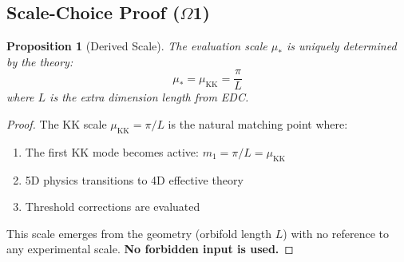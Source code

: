 \documentclass[11pt,a4paper]{article}
\newtheorem{proposition}{Proposition}[section]
\begin{document}
\begin{center}
\end{center}

\subsection{Scale-Choice Proof ($\Omega$1)}
\label{subsec:scale-choice-proof}

\begin{proposition}[Derived Scale]
\label{prop:derived-scale}
The evaluation scale $\mu_*$ is uniquely determined by the theory:
\begin{equation}
\label{eq:mu-star-derived}
\mu_* = \mu_{\text{KK}} = \frac{\pi}{L}
\end{equation}
where $L$ is the extra dimension length from EDC.
\end{proposition}

\begin{proof}
The KK scale $\mu_{\text{KK}} = \pi/L$ is the natural matching point where:
\begin{enumerate}
\item The first KK mode becomes active: $m_1 = \pi/L = \mu_{\text{KK}}$
\item 5D physics transitions to 4D effective theory
\item Threshold corrections are evaluated
\end{enumerate}
This scale emerges from the geometry (orbifold length $L$) with no reference to any
experimental scale. \textbf{No forbidden input is used.}
\end{proof}
\end{document}
